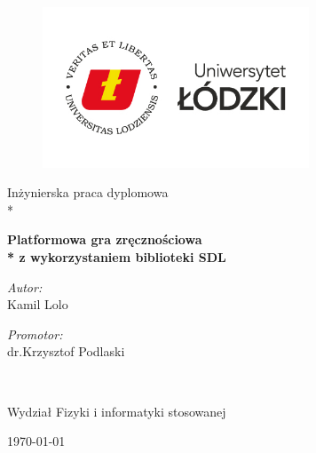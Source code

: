\documentclass[12pt, a4paper, oneside]{Thesis} %
\begin{document}
\begin{titlepage}
\begin{center}

\begin{figure}
    \centering
    \includegraphics[width=300px]{./Pictures/logo.jpg}
\end{figure}

\begin{center}
\Large Inżynierska praca dyplomowa \\*
\end{center}

\addvspace{40pt}

{\huge \bfseries Platformowa gra zręcznościowa \\* z wykorzystaniem biblioteki SDL }\\[0.4cm] %

\addvspace{110pt}
 
\begin{minipage}{0.4\textwidth}
\begin{flushleft} \large
\emph{Autor:}\\
Kamil Lolo 
\end{flushleft}
\end{minipage}
\begin{minipage}{0.4\textwidth}
\begin{flushright} \large
\emph{Promotor:} \\
dr.Krzysztof Podlaski
\end{flushright}
\end{minipage}\\[3cm]


\vfill
\addvspace{50pt}
\begin{center}
Wydział Fizyki i informatyki stosowanej
\end{center}
{\large \today}\\[4cm] %


\end{center}
\end{titlepage}
\end{document}
